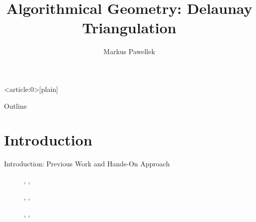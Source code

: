\documentclass[aspectratio=169]{beamer}
\title{%
  Algorithmical Geometry: Delaunay Triangulation%
}
\author{Markus Pawellek}
\begin{document}

{ %
  \begin{frame}<article:0>[plain]
  \end{frame}
}

\frame{\titlepage}
\begin{frame}{Outline}
  \footnotesize
  \hfill\parbox[t][7cm][l]{0.9\textwidth}{\tableofcontents}
\end{frame}

\section{Introduction}
\begin{frame}{Introduction: Previous Work and Hands-On Approach}
  \begin{description}
    \item[\autocite{shewchuk1996}] \citeauthor{shewchuk1996}, , \citeyear{shewchuk1996}
    \item[\autocite{guibas1985}] \citeauthor{guibas1985}, , \citeyear{guibas1985}
    \item[\autocite{dwyer1987}] \citeauthor{dwyer1987}, , \citeyear{dwyer1987}
  \end{description}
\end{frame}
\end{document}
